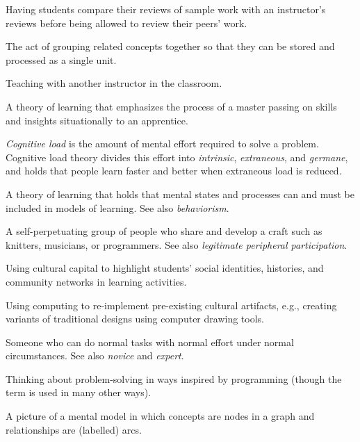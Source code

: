 \begin{description}

 Having
students compare their reviews of sample work with an instructor's
reviews before being allowed to review their peers' work.

 The act of grouping related concepts
together so that they can be stored and processed as a single unit.

 Teaching with another instructor
in the classroom.

 A
theory of learning that emphasizes the process of a master passing on
skills and insights situationally to an apprentice.

\emph{Cognitive load} is the amount of mental effort required to solve
a problem.  Cognitive load theory divides this effort into
\emph{intrinsic}, \emph{extraneous}, and \emph{germane}, and holds
that people learn faster and better when extraneous load is reduced.
 
 A theory of learning that holds
that mental states and processes can and must be included in models of
learning. See also \emph{behaviorism}.

 A
self-perpetuating group of people who share and develop a craft such
as knitters, musicians, or programmers. See also \emph{legitimate
peripheral participation}.

 Using
cultural capital to highlight students' social identities, histories,
and community networks in learning activities.

Using computing to re-implement pre-existing cultural artifacts, e.g.,
creating variants of traditional designs using computer drawing tools.

 Someone
who can do normal tasks with normal effort under normal
circumstances. See also \emph{novice} and \emph{expert}.

 Thinking
about problem-solving in ways inspired by programming (though the term
is used in many other ways).

 A picture of a mental model in
which concepts are nodes in a graph and relationships are (labelled)
arcs.


\end{description}

